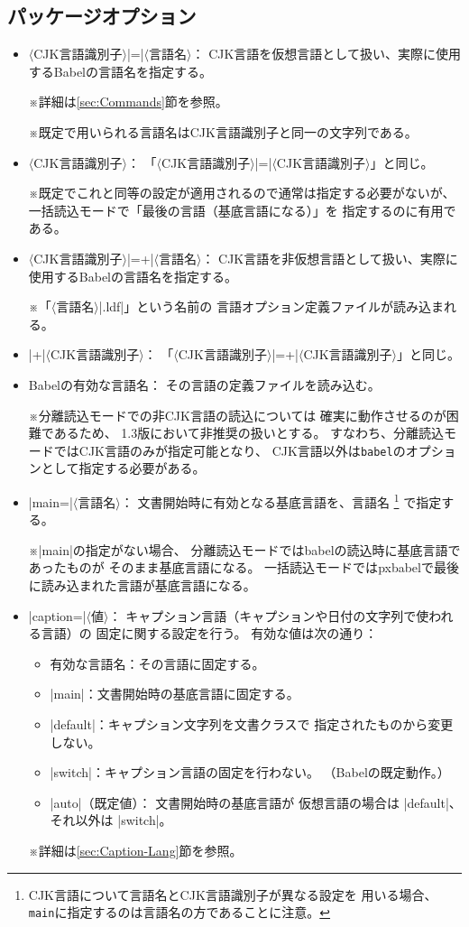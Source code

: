 \documentclass[uplatex,dvipdfmx,a4paper]{jsarticle}
\renewcommand{\headfont}{\gtfamily\romanseries{sbc}\sffamily}
\newcommand{\Pkg}[1]{\textsf{#1}}
\newcommand{\Meta}[1]{$\langle$\mbox{}#1\mbox{}$\rangle$}
\newcommand{\Note}{\par\noindent ※}
\newcommand{\Means}{：\quad\inhibitglue}
\newcommand{\Strong}[1]{{\headfont#1}}
\begin{document}
\subsection{パッケージオプション}
\label{ssec:options}

\begin{itemize}
\item \Meta{CJK言語識別子}|=|\Meta{言語名}\Means
CJK言語を仮想言語として扱い、実際に使用するBabelの言語名を指定する。
\Note 詳細は\ref{sec:Commands}節を参照。
\Note 既定で用いられる言語名はCJK言語識別子と同一の文字列である。

\item \Meta{CJK言語識別子}\Means
「\Meta{CJK言語識別子}|=|\Meta{CJK言語識別子}」と同じ。
\Note 既定でこれと同等の設定が適用されるので通常は指定する必要がないが、
一括読込モードで「最後の言語（基底言語になる）」を
指定するのに有用である。

\item \Meta{CJK言語識別子}|=+|\Meta{言語名}\Means
CJK言語を非仮想言語として扱い、実際に使用するBabelの言語名を指定する。
\Note 「\Meta{言語名}|.ldf|」という名前の
言語オプション定義ファイルが読み込まれる。

\item |+|\Meta{CJK言語識別子}\Means
「\Meta{CJK言語識別子}|=+|\Meta{CJK言語識別子}」と同じ。

\item Babelの有効な言語名\Means
その言語の定義ファイルを読み込む。
\Note 分離読込モードでの非CJK言語の読込については
確実に動作させるのが困難であるため、
1.3版において\Strong{非推奨}の扱いとする。
すなわち、分離読込モードではCJK言語のみが指定可能となり、
CJK言語以外は\texttt{babel}のオプションとして指定する必要がある。

\item |main=|\Meta{言語名}\Means
文書開始時に有効となる基底言語を、言語名
\footnote{CJK言語について言語名とCJK言語識別子が異なる設定を
用いる場合、\texttt{main}に指定するのは言語名の方であることに注意。}%
で指定する。
\Note |main|の指定がない場合、
分離読込モードでは\Pkg{babel}の読込時に基底言語であったものが
そのまま基底言語になる。
一括読込モードでは\Pkg{pxbabel}で最後に読み込まれた言語が基底言語になる。

\item |caption=|\Meta{値}\Means
キャプション言語（キャプションや日付の文字列で使われる言語）の
固定に関する設定を行う。
有効な値は次の通り：
  \begin{itemize}
  \item 有効な言語名\Means その言語に固定する。
  \item |main|\Means 文書開始時の基底言語に固定する。
  \item |default|\Means キャプション文字列を文書クラスで
  指定されたものから変更しない。
  \item |switch|\Means キャプション言語の固定を行わない。
  （Babelの既定動作。）
  \item |auto|（既定値）\Means
  文書開始時の基底言語が
  仮想言語の場合は |default|、
  それ以外は |switch|。
  \end{itemize}
\Note 詳細は\ref{sec:Caption-Lang}節を参照。


\end{itemize}
\end{document}
